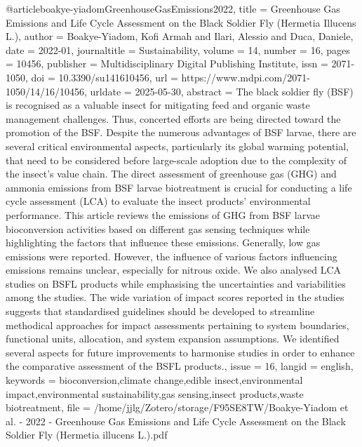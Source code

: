 {{{@article{boakye-yiadomGreenhouseGasEmissions2022,
  title = {Greenhouse {{Gas Emissions}} and {{Life Cycle Assessment}} on the {{Black Soldier Fly}} ({{Hermetia}} Illucens {{L}}.)},
  author = {Boakye-Yiadom, Kofi Armah and Ilari, Alessio and Duca, Daniele},
  date = {2022-01},
  journaltitle = {Sustainability},
  volume = {14},
  number = {16},
  pages = {10456},
  publisher = {Multidisciplinary Digital Publishing Institute},
  issn = {2071-1050},
  doi = {10.3390/su141610456},
  url = {https://www.mdpi.com/2071-1050/14/16/10456},
  urldate = {2025-05-30},
  abstract = {The black soldier fly (BSF) is recognised as a valuable insect for mitigating feed and organic waste management challenges. Thus, concerted efforts are being directed toward the promotion of the BSF. Despite the numerous advantages of BSF larvae, there are several critical environmental aspects, particularly its global warming potential, that need to be considered before large-scale adoption due to the complexity of the insect’s value chain. The direct assessment of greenhouse gas (GHG) and ammonia emissions from BSF larvae biotreatment is crucial for conducting a life cycle assessment (LCA) to evaluate the insect products’ environmental performance. This article reviews the emissions of GHG from BSF larvae bioconversion activities based on different gas sensing techniques while highlighting the factors that influence these emissions. Generally, low gas emissions were reported. However, the influence of various factors influencing emissions remains unclear, especially for nitrous oxide. We also analysed LCA studies on BSFL products while emphasising the uncertainties and variabilities among the studies. The wide variation of impact scores reported in the studies suggests that standardised guidelines should be developed to streamline methodical approaches for impact assessments pertaining to system boundaries, functional units, allocation, and system expansion assumptions. We identified several aspects for future improvements to harmonise studies in order to enhance the comparative assessment of the BSFL products.},
  issue = {16},
  langid = {english},
  keywords = {bioconversion,climate change,edible insect,environmental impact,environmental sustainability,gas sensing,insect products,waste biotreatment},
  file = {/home/jjlg/Zotero/storage/F95SE8TW/Boakye-Yiadom et al. - 2022 - Greenhouse Gas Emissions and Life Cycle Assessment on the Black Soldier Fly (Hermetia illucens L.).pdf}
}

}}}
